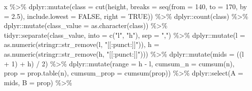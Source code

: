 \documentclass[
  12pt,
]{book}
\newenvironment{Shaded}{\begin{snugshade}}{\end{snugshade}}
\newcommand{\AttributeTok}[1]{\textcolor[rgb]{0.77,0.63,0.00}{#1}}
\newcommand{\ConstantTok}[1]{\textcolor[rgb]{0.00,0.00,0.00}{#1}}
\newcommand{\DecValTok}[1]{\textcolor[rgb]{0.00,0.00,0.81}{#1}}
\newcommand{\FloatTok}[1]{\textcolor[rgb]{0.00,0.00,0.81}{#1}}
\newcommand{\FunctionTok}[1]{\textcolor[rgb]{0.00,0.00,0.00}{#1}}
\newcommand{\NormalTok}[1]{#1}
\newcommand{\SpecialCharTok}[1]{\textcolor[rgb]{0.00,0.00,0.00}{#1}}
\newcommand{\StringTok}[1]{\textcolor[rgb]{0.31,0.60,0.02}{#1}}
\begin{document}
\begin{Shaded}
\begin{Highlighting}[]
\NormalTok{x }\SpecialCharTok{\%\textgreater{}\%} 
\NormalTok{  dplyr}\SpecialCharTok{::}\FunctionTok{mutate}\NormalTok{(}\AttributeTok{class =} \FunctionTok{cut}\NormalTok{(height,}
                            \AttributeTok{breaks =} \FunctionTok{seq}\NormalTok{(}\AttributeTok{from =} \DecValTok{140}\NormalTok{, }\AttributeTok{to =} \DecValTok{170}\NormalTok{, }\AttributeTok{by =} \FloatTok{2.5}\NormalTok{),}
                            \AttributeTok{include.lowest =} \ConstantTok{FALSE}\NormalTok{, }\AttributeTok{right =} \ConstantTok{TRUE}\NormalTok{)) }\SpecialCharTok{\%\textgreater{}\%} 
\NormalTok{  dplyr}\SpecialCharTok{::}\FunctionTok{count}\NormalTok{(class) }\SpecialCharTok{\%\textgreater{}\%} 
\NormalTok{  dplyr}\SpecialCharTok{::}\FunctionTok{mutate}\NormalTok{(}\AttributeTok{class\_value =} \FunctionTok{as.character}\NormalTok{(class)) }\SpecialCharTok{\%\textgreater{}\%} 
\NormalTok{  tidyr}\SpecialCharTok{::}\FunctionTok{separate}\NormalTok{(class\_value, }\AttributeTok{into =} \FunctionTok{c}\NormalTok{(}\StringTok{"l"}\NormalTok{, }\StringTok{"h"}\NormalTok{), }\AttributeTok{sep =} \StringTok{","}\NormalTok{) }\SpecialCharTok{\%\textgreater{}\%} 
\NormalTok{  dplyr}\SpecialCharTok{::}\FunctionTok{mutate}\NormalTok{(}\AttributeTok{l =} \FunctionTok{as.numeric}\NormalTok{(stringr}\SpecialCharTok{::}\FunctionTok{str\_remove}\NormalTok{(l, }\StringTok{"[[:punct:]]"}\NormalTok{)),}
                \AttributeTok{h =} \FunctionTok{as.numeric}\NormalTok{(stringr}\SpecialCharTok{::}\FunctionTok{str\_remove}\NormalTok{(h, }\StringTok{"[[:punct:]]"}\NormalTok{))) }\SpecialCharTok{\%\textgreater{}\%} 
\NormalTok{  dplyr}\SpecialCharTok{::}\FunctionTok{mutate}\NormalTok{(}\AttributeTok{mids =}\NormalTok{ ((l }\SpecialCharTok{+} \DecValTok{1}\NormalTok{) }\SpecialCharTok{+}\NormalTok{ h) }\SpecialCharTok{/} \DecValTok{2}\NormalTok{) }\SpecialCharTok{\%\textgreater{}\%} 
\NormalTok{  dplyr}\SpecialCharTok{::}\FunctionTok{mutate}\NormalTok{(}\AttributeTok{range =}\NormalTok{ h }\SpecialCharTok{{-}}\NormalTok{ l, }\AttributeTok{cumsum\_n =} \FunctionTok{cumsum}\NormalTok{(n),}
                \AttributeTok{prop =} \FunctionTok{prop.table}\NormalTok{(n), }\AttributeTok{cumsum\_prop =} \FunctionTok{cumsum}\NormalTok{(prop)) }\SpecialCharTok{\%\textgreater{}\%} 
\NormalTok{  dplyr}\SpecialCharTok{::}\FunctionTok{select}\NormalTok{(}\AttributeTok{A =}\NormalTok{ mids, }\AttributeTok{B =}\NormalTok{ prop) }\SpecialCharTok{\%\textgreater{}\%} 

\end{Highlighting}
\end{Shaded}
\end{document}
